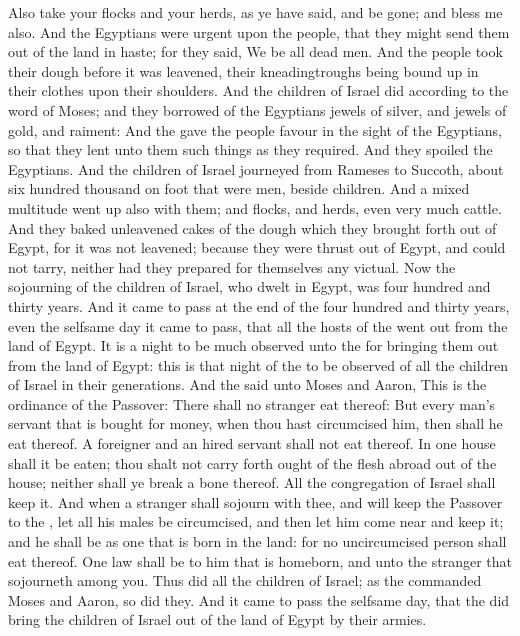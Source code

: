 \begin{biblechapter}
\verse Also take your flocks and your herds, as ye have said, and be gone; and bless me also.
\verse And the Egyptians were urgent upon the people, that they might send them out of the land in haste; for they said, We be all dead men.
\verse And the people took their dough before it was leavened, their kneadingtroughs being bound up in their clothes upon their shoulders.
\verse And the children of Israel did according to the word of Moses; and they borrowed of the Egyptians jewels of silver, and jewels of gold, and raiment:
\verse And the \LORD gave the people favour in the sight of the Egyptians, so that they lent unto them such things as they required. And they spoiled the Egyptians.
\verse And the children of Israel journeyed from Rameses to Succoth, about six hundred thousand on foot that were men, beside children.
\verse And a mixed multitude went up also with them; and flocks, and herds, even very much cattle.
\verse And they baked unleavened cakes of the dough which they brought forth out of Egypt, for it was not leavened; because they were thrust out of Egypt, and could not tarry, neither had they prepared for themselves any victual.
\verse Now the sojourning of the children of Israel, who dwelt in Egypt, was four hundred and thirty years.
\verse And it came to pass at the end of the four hundred and thirty years, even the selfsame day it came to pass, that all the hosts of the \LORD went out from the land of Egypt.
\verse It is a night to be much observed unto the \LORD for bringing them out from the land of Egypt: this is that night of the \LORD to be observed of all the children of Israel in their generations.
 And the \LORD said unto Moses and Aaron, This is the ordinance of the Passover: There shall no stranger eat thereof:
\verse But every man's servant that is bought for money, when thou hast circumcised him, then shall he eat thereof.
\verse A foreigner and an hired servant shall not eat thereof.
\verse In one house shall it be eaten; thou shalt not carry forth ought of the flesh abroad out of the house; neither shall ye break a bone thereof.
\verse All the congregation of Israel shall keep it.
\verse And when a stranger shall sojourn with thee, and will keep the Passover to the \LORD, let all his males be circumcised, and then let him come near and keep it; and he shall be as one that is born in the land: for no uncircumcised person shall eat thereof.
\verse One law shall be to him that is homeborn, and unto the stranger that sojourneth among you.
\verse Thus did all the children of Israel; as the \LORD commanded Moses and Aaron, so did they.
\verse And it came to pass the selfsame day, that the \LORD did bring the children of Israel out of the land of Egypt by their armies.
\end{biblechapter}

